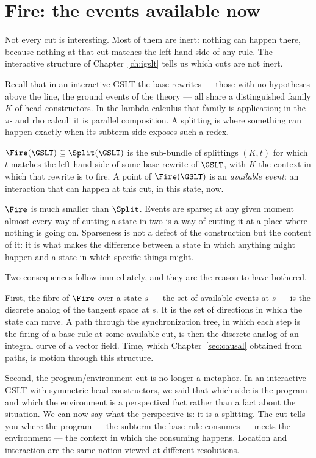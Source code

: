 \section{Fire: the events available now}

Not every cut is interesting.
Most of them are inert: nothing can happen there, because nothing
at that cut matches the left-hand side of any rule.
The interactive structure of Chapter~\ref{ch:igslt} tells us which
cuts are not inert.

Recall that in an interactive GSLT the base rewrites --- those
with no hypotheses above the line, the ground events of the
theory --- all share a distinguished family $K$ of head
constructors.
In the lambda calculus that family is application; in the $\pi$-
and rho calculi it is parallel composition.
A splitting is where something can happen exactly when its
subterm side exposes such a redex.

\begin{definition}
\label{def:fire}
$\Fire(\GSLT) \subseteq \Split(\GSLT)$ is the sub-bundle of
splittings $(K,t)$ for which $t$ matches the left-hand side of
some base rewrite of $\GSLT$, with $K$ the context in which that
rewrite is to fire.
A point of $\Fire(\GSLT)$ is an \emph{available event}: an
interaction that can happen at this cut, in this state, now.
\end{definition}

$\Fire$ is much smaller than $\Split$.
Events are sparse; at any given moment almost every way of cutting
a state in two is a way of cutting it at a place where nothing is
going on.
Sparseness is not a defect of the construction but the content of
it: it is what makes the difference between a state in which
anything might happen and a state in which specific things might.

Two consequences follow immediately, and they are the reason to
have bothered.

First, the fibre of $\Fire$ over a state $s$ --- the set of
available events at $s$ --- is the discrete analog of the
tangent space at $s$.
It is the set of directions in which the state can move.
A path through the synchronization tree, in which each step is the
firing of a base rule at some available cut, is then the discrete
analog of an integral curve of a vector field.
Time, which Chapter~\ref{sec:causal} obtained from paths, is
motion through this structure.

Second, the program/environment cut is no longer a metaphor.
In an interactive GSLT with symmetric head constructors, we said
that which side is the program and which the environment is a
perspectival fact rather than a fact about the situation.
We can now say what the perspective is: it is a splitting.
The cut tells you where the program --- the subterm the base rule
consumes --- meets the environment --- the context in which the
consuming happens.
Location and interaction are the same notion viewed at different
resolutions.

